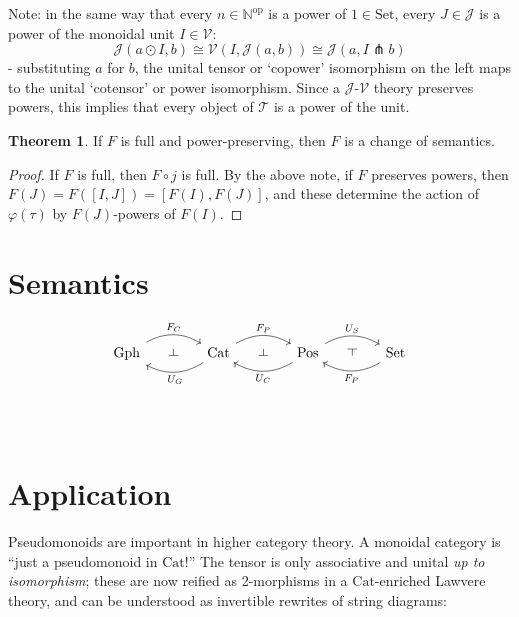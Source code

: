 \documentclass[a4paper,UKenglish]{article}
\theoremstyle{definition}
\newtheorem*{theorem*}{Theorem}
\def\rd{\rotatebox[origin=c]{90}{$\dashv$}} %
\def\ld{\rotatebox[origin=c]{-90}{$\dashv$}} %
\newcommand{\Gph}{\mathrm{Gph}}
\newcommand{\Set}{\mathrm{Set}}
\newcommand{\Cat}{\mathrm{Cat}}
\newcommand{\Pos}{\mathrm{Pos}}
\newcommand{\op}{\mathrm{op}}
\newcommand{\NN}{\mathbb{N}}
\newcommand{\V}{\mathscr{V}}
\newcommand{\T}{\mathscr{T}}
\newcommand{\J}{\mathscr{J}}
\newcommand{\pfk}{\pitchfork}
\begin{document}
Note: in the same way that every $n\in \NN^\op$ is a power of $1 \in \Set$, every $J\in \J$ is a power of the monoidal unit $I\in \V$: $$\J(a\odot I,b) \cong \V(I, \J(a,b)) \cong \J(a,I\pfk b)$$ - substituting $a$ for $b$, the unital tensor or `copower' isomorphism on the left maps to the unital `cotensor' or power isomorphism. Since a $\J$-$\V$ theory preserves powers, this implies that every object of $\T$ is a power of the unit.

\theoremstyle{theorem}
\begin{theorem*}
	If $F$ is full and power-preserving, then $F$ is a change of semantics.
\end{theorem*}
\begin{proof}
	If $F$ is full, then $F\circ j$ is full. By the above note, if $F$ preserves powers, then $F(J) = F([I,J]) = [F(I),F(J)]$, and these determine the action of $\varphi(\tau)$ by $F(J)$-powers of $F(I)$.
\end{proof}

\section{Semantics}
\[
\begin{tikzcd}[column sep=small]
\Gph \arrow[bend left,below]{rr}{F_C}
& \ld &
\arrow[bend left,above]{ll}{U_G} \Cat \arrow[bend left,below]{rr}{F_P}
& \ld &
\arrow[bend left,above]{ll}{U_C} \Pos \arrow[bend left,below]{rr}{U_S}
& \rd &
\Set \arrow[bend left,above]{ll}{F_P}
\end{tikzcd}
\]\\\\

\section{Application}
Pseudomonoids \cite{pseudo} are important in higher category theory. A monoidal category is ``just a pseudomonoid in $\Cat$!'' The tensor is only associative and unital \textit{up to isomorphism}; these are now reified as 2-morphisms in a $\Cat$-enriched Lawvere theory, and can be understood as invertible rewrites of string diagrams:
\end{document}
